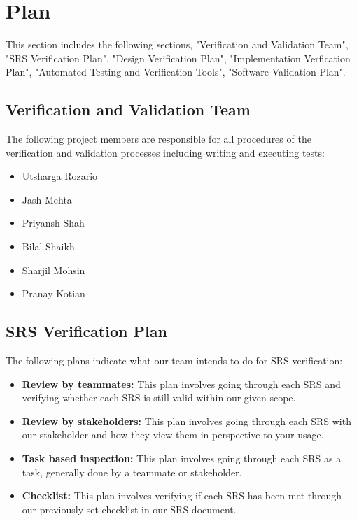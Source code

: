 \documentclass[12pt, titlepage]{article}
\begin{document}
\section{Plan}

This section includes the following sections, "Verification and Validation Team", "SRS Verification Plan", "Design Verification Plan", "Implementation Verfication Plan", "Automated Testing and Verification Tools", "Software Validation Plan".

\subsection{Verification and Validation Team}

The following project members are responsible for all procedures of the verification and validation processes including writing and executing tests:
\begin{itemize}
    \item Utsharga Rozario
    \item Jash Mehta
    \item Priyansh Shah
    \item Bilal Shaikh
    \item Sharjil Mohsin
    \item Pranay Kotian
\end{itemize}

\subsection{SRS Verification Plan}

The following plans indicate what our team intends to do for SRS verification:
\begin{itemize}
    \item \textbf{Review by teammates:} This plan involves going through each SRS and verifying whether each SRS is still valid within our given scope.
    \item \textbf{Review by stakeholders:} This plan involves going through each SRS with our stakeholder and how they view them in perspective to your usage.
    \item \textbf{Task based inspection:} This plan involves going through each SRS as a task, generally done by a teammate or stakeholder.
    \item \textbf{Checklist:} This plan involves verifying if each SRS has been met through our previously set checklist in our SRS document.
\end{itemize}
\end{document}
